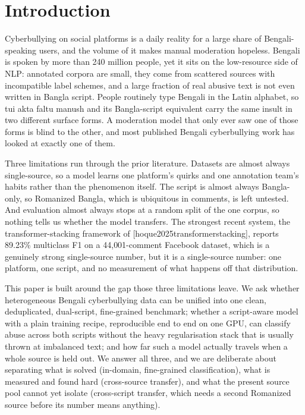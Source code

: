 \documentclass[11pt,a4paper]{article}
\def\citet#1{[#1]}%
\def\emph#1{#1}%
\begin{document}
\vspace{0.2em}

\section{Introduction}
\label{sec:introduction}

Cyberbullying on social platforms is a daily reality for a large share of Bengali-speaking users, and the volume of it makes manual moderation hopeless. Bengali is spoken by more than 240 million people, yet it sits on the low-resource side of NLP: annotated corpora are small, they come from scattered sources with incompatible label schemes, and a large fraction of real abusive text is not even written in Bangla script. People routinely type Bengali in the Latin alphabet, so \emph{tui akta faltu manush} and its Bangla-script equivalent carry the same insult in two different surface forms. A moderation model that only ever saw one of those forms is blind to the other, and most published Bengali cyberbullying work has looked at exactly one of them.

Three limitations run through the prior literature. Datasets are almost always single-source, so a model learns one platform's quirks and one annotation team's habits rather than the phenomenon itself. The script is almost always Bangla-only, so Romanized Bangla, which is ubiquitous in comments, is left untested. And evaluation almost always stops at a random split of the one corpus, so nothing tells us whether the model transfers. The strongest recent system, the transformer-stacking framework of \citet{hoque2025transformerstacking}, reports 89.23\% multiclass F1 on a 44{,}001-comment Facebook dataset, which is a genuinely strong single-source number, but it is a single-source number: one platform, one script, and no measurement of what happens off that distribution.

This paper is built around the gap those three limitations leave. We ask whether heterogeneous Bengali cyberbullying data can be unified into one clean, deduplicated, dual-script, fine-grained benchmark; whether a script-aware model with a plain training recipe, reproducible end to end on one GPU, can classify abuse across both scripts without the heavy regularisation stack that is usually thrown at imbalanced text; and how far such a model actually travels when a whole source is held out. We answer all three, and we are deliberate about separating what is solved (in-domain, fine-grained classification), what is measured and found hard (cross-source transfer), and what the present source pool cannot yet isolate (cross-script transfer, which needs a second Romanized source before its number means anything).
\end{document}
